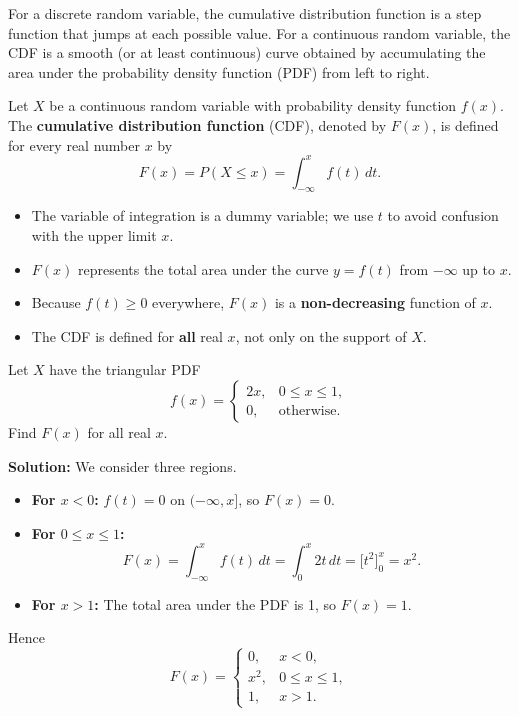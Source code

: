 \documentclass[11pt]{article}
\begin{document}
For a discrete random variable, the cumulative distribution function is a step function that jumps at each possible value. For a continuous random variable, the CDF is a smooth (or at least continuous) curve obtained by accumulating the area under the probability density function (PDF) from left to right.

\begin{definition}
Let \(X\) be a continuous random variable with probability density function \(f(x)\). The \textbf{cumulative distribution function} (CDF), denoted by \(F(x)\), is defined for every real number \(x\) by
\[
F(x) = P(X \le x) = \int_{-\infty}^{x} f(t)\, dt.
\]
\end{definition}

\begin{itemize}
\item The variable of integration is a dummy variable; we use \(t\) to avoid confusion with the upper limit \(x\).
\item \(F(x)\) represents the total area under the curve \(y = f(t)\) from \(-\infty\) up to \(x\).
\item Because \(f(t) \ge 0\) everywhere, \(F(x)\) is a \textbf{non-decreasing} function of \(x\).
\item The CDF is defined for \textbf{all} real \(x\), not only on the support of \(X\).
\end{itemize}

\begin{exemplebox}
Let \(X\) have the triangular PDF
\[
f(x) = \begin{cases}
2x, & 0 \le x \le 1,\\
0, & \text{otherwise}.
\end{cases}
\]
Find \(F(x)\) for all real \(x\).

\textbf{Solution:}
We consider three regions.
\begin{itemize}
\item \textbf{For \(x < 0\):} \(f(t)=0\) on \((-\infty, x]\), so \(F(x)=0\).
\item \textbf{For \(0 \le x \le 1\):}
\[
F(x) = \int_{-\infty}^{x} f(t)\, dt = \int_{0}^{x} 2t\, dt = \bigl[t^2\bigr]_{0}^{x} = x^2.
\]
\item \textbf{For \(x > 1\):} The total area under the PDF is 1, so \(F(x)=1\).
\end{itemize}
Hence
\[
F(x) = \begin{cases}
0, & x < 0,\\
x^2, & 0 \le x \le 1,\\
1, & x > 1.
\end{cases}
\]
\end{exemplebox}
\end{document}
